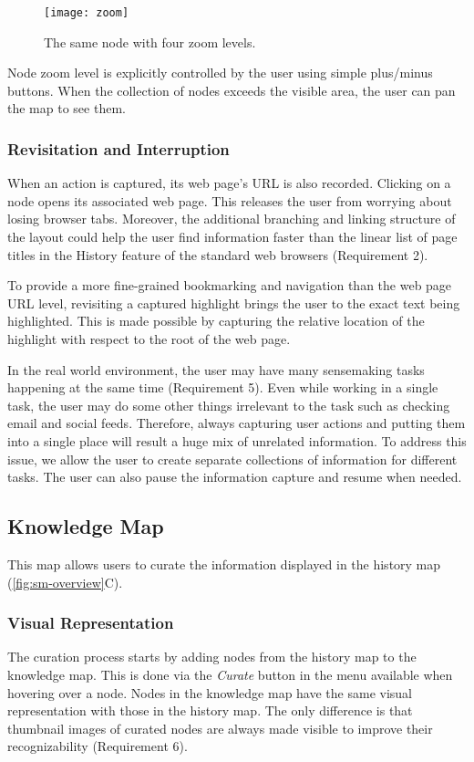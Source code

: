 \begin{figure}[!htb]
	\centering
	\texttt{[image: zoom]}
	\caption{The same node with four zoom levels.}
	\label{fig:zoom}
\end{figure}

Node zoom level is explicitly controlled by the user using simple plus/minus buttons. When the collection of nodes exceeds the visible area, the user can pan the map to see them.

\subsubsection{Revisitation and Interruption}
When an action is captured, its web page's URL is also recorded. Clicking on a node opens its associated web page. This releases the user from worrying about losing browser tabs. Moreover, the additional branching and linking structure of the layout could help the user find information faster than the linear list of page titles in the History feature of the standard web browsers (Requirement 2).

To provide a more fine-grained bookmarking and navigation than the web page URL level, revisiting a captured highlight brings the user to the exact text being highlighted. This is made possible by capturing the relative location of the highlight with respect to the root of the web page.

In the real world environment, the user may have many sensemaking tasks happening at the same time (Requirement 5). Even while working in a single task, the user may do some other things irrelevant to the task such as checking email and social feeds. Therefore, always capturing user actions and putting them into a single place will result a huge mix of unrelated information. To address this issue, we allow the user to create separate collections of information for different tasks. The user can also pause the information capture and resume when needed.

\subsection{Knowledge Map}
This map allows users to curate the information displayed in the history map (\autoref{fig:sm-overview}C).

\subsubsection{Visual Representation}
The curation process starts by adding nodes from the history map to the knowledge map. This is done via the \textit{Curate} button in the menu available when hovering over a node. Nodes in the knowledge map have the same visual representation with those in the history map. The only difference is that thumbnail images of curated nodes are always made visible to improve their recognizability (Requirement 6).

